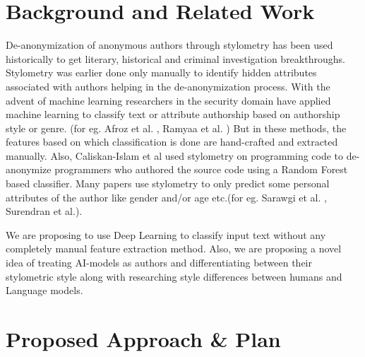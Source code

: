 \documentclass[11pt,letterpaper]{article}
\begin{document}
\section{Background and Related Work}

De-anonymization of anonymous authors through stylometry has been used historically to get literary, historical and criminal investigation breakthroughs. Stylometry was earlier done only manually to identify hidden attributes associated with authors helping in the de-anonymization process. With the advent of machine learning researchers in the security domain have applied machine learning to classify text or attribute authorship based on authorship style or genre. (for eg. Afroz et al. \cite{afroz2014doppelganger}, Ramyaa et al. \cite{ramyaa2004using})  But in these methods, the features based on which classification is done are hand-crafted and extracted manually. Also, Caliskan-Islam et al \cite{caliskan2015anonymizing} used stylometry on programming code to de-anonymize programmers who authored the source code using a Random Forest based classifier. Many papers use stylometry to only predict some personal attributes of the author like gender and/or age etc.(for eg. Sarawgi et al. \cite{sarawgi2011gender},  Surendran et al.\cite{surendran2017stylometry}). 
\par We are proposing to use Deep Learning to classify input text without any completely manual feature extraction method. Also, we are proposing a novel idea of treating AI-models as authors and differentiating between their stylometric style along with researching style differences between humans and Language models.



\section{Proposed Approach \& Plan}
\end{document}
